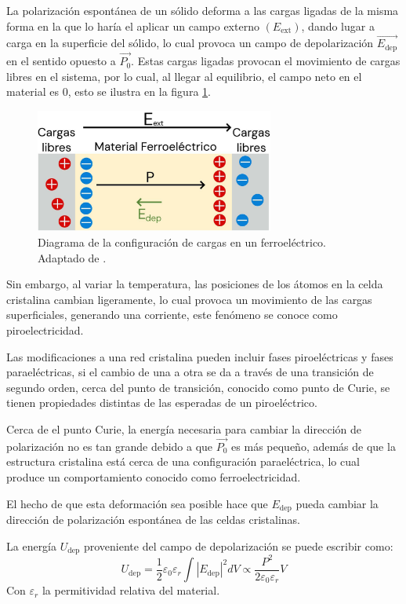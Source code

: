 \documentclass[../main.tex]{subfiles}
\begin{document}
La polarización espontánea de un sólido deforma a las cargas ligadas de la misma forma en la que lo haría el aplicar un campo externo $(E_{\text{ext}})$, dando lugar a carga en la superficie del sólido, lo cual provoca un campo de depolarización $\vec{E_\text{dep}}$ en el sentido opuesto a $\vec{P_0}$. Estas cargas ligadas provocan el movimiento de cargas libres en el sistema, por lo cual, al llegar al equilibrio, el campo neto en el material es 0, esto se ilustra en la figura \ref{fig:ferroelecdiag}.
\begin{figure}[H]
    \centering
    \includegraphics[width=0.7\textwidth]{fig/ferroelecdiag.jpg}
    \caption{Diagrama de la configuración de cargas en un ferroeléctrico. Adaptado de \cite{Qiao2021}.}
    \label{fig:ferroelecdiag}
\end{figure}
Sin embargo, al variar la temperatura, las posiciones de los átomos en la celda cristalina cambian ligeramente, lo cual provoca un movimiento de las cargas superficiales, generando una corriente, este fenómeno se conoce como piroelectricidad.

Las modificaciones a una red cristalina pueden incluir fases piroeléctricas y fases paraeléctricas, si el cambio de una a otra se da a través de una transición de segundo orden, cerca del punto de transición, conocido como punto de Curie, se tienen propiedades distintas de las esperadas de un piroeléctrico.

Cerca de el punto Curie, la energía necesaria para cambiar la dirección de polarización no es tan grande debido a que $\vec{P_{0}}$ es más pequeño, además de que la estructura cristalina está cerca de una configuración paraeléctrica, lo cual produce un comportamiento conocido como ferroelectricidad.

El hecho de que esta deformación sea posible hace que $E_\text{dep}$ pueda cambiar la dirección de polarización espontánea de las celdas cristalinas.

La energía $U_\text{dep}$ proveniente del campo de depolarización se puede escribir como:
\begin{equation}
    U_\text{dep}=\dfrac{1}{2}\varepsilon_0\varepsilon_r\int|E_\text{dep}|^2dV\propto\dfrac{P^2}{2\varepsilon_0\varepsilon_r}V
    \label{eq:energiadepolarizacion}
\end{equation}
Con $\varepsilon_r$ la permitividad relativa del material.
\end{document}
